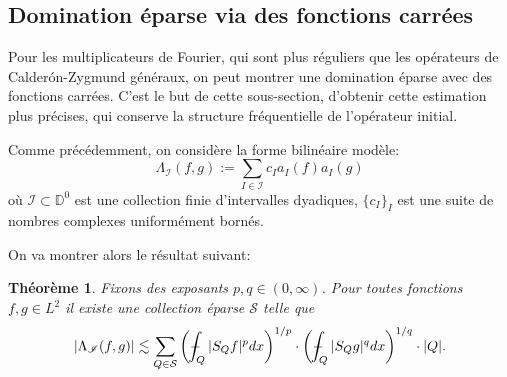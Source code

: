 \documentclass[11pt]{amsart}
\newtheorem{theorem}{Th\'eor\`eme}
\newcommand{\rr}{\mathbb}
\newcommand{\ii}{\mathscr}
\newcommand{\mcS}{{\mathcal S}}
\newcommand{\Dy}{{\mathbb D}}
\def\Xint#1{\mathchoice
   {\XXint\displaystyle\textstyle{#1}}%
   {\XXint\textstyle\scriptstyle{#1}}%
   {\XXint\scriptstyle\scriptscriptstyle{#1}}%
   {\XXint\scriptscriptstyle\scriptscriptstyle{#1}}%
   \!\int}
\def\XXint#1#2#3{{\setbox0=\hbox{$#1{#2#3}{\int}$}
     \vcenter{\hbox{$#2#3$}}\kern-.5\wd0}}
\def\aver#1{\Xint-_{#1}}
\begin{document}
\subsection{Domination \'eparse via des fonctions carr\'ees}
\label{subsec:carre}

Pour les multiplicateurs de Fourier, qui sont plus r\'eguliers que les op\'erateurs de Calder\'on-Zygmund g\'en\'eraux, on peut montrer une domination \'eparse avec des fonctions carr\'ees. C'est le but de cette sous-section, d'obtenir cette estimation plus pr\'ecises, qui conserve la structure fr\'equentielle de l'op\'erateur initial.

Comme pr\'ec\'edemment, on consid\`ere la forme bilin\'eaire mod\`ele:
\begin{equation}
\label{def:operator}
\Lambda_\ii I (f, g):=\sum_{I \in \ii I } c_I a_I(f) a_I(g)
\end{equation}
o\`u $\ii I \subset \Dy^0$ est une collection finie d'intervalles dyadiques, $\lbrace  c_I \rbrace_I$ est une suite de nombres complexes uniform\'ement born\'es.

On va montrer alors le r\'esultat suivant:

\begin{theorem} \label{thm:sparsecarre} Fixons des exposants $p,q\in(0,\infty)$. Pour toutes fonctions $f,g \in L^2$ il existe une collection \'eparse $\mcS$ telle que 
$$ \left|\Lambda_\ii I (f, g)\right| \lesssim \sum_{Q\in \mcS} \left(\aver{Q} |S_Qf|^p  dx \right)^{1/p} \cdot \left(\aver{Q} |S_Qg|^q  dx \right)^{1/q} \cdot |Q|.$$
\end{theorem}

\end{document}

